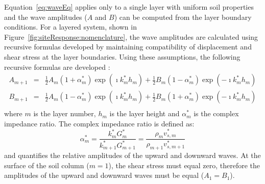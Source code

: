 \documentclass[12pt,oneside]{book}
\begin{document}
Equation~\ref{eq:waveEq} applies only to a single layer with uniform soil
properties and the wave amplitudes ($A$ and $B$) can be computed from the layer
boundary conditions.  For a layered system, shown in
Figure~\ref{fig:siteResponse:nomenclature}, the wave amplitudes are calculated
using recursive formulas developed by maintaining compatibility of displacement
and shear stress at the layer boundaries.  Using these assumptions, the
following recursive formulas are developed \citep{kramer:96}:
\begin{equation}
    \begin{array}{rcl}
        A_{m+1} & = & \frac{1}{2} A_m \left( 1 + \alpha_m^* \right) \exp\left(\imath k_m^* h_m \right) +
        \frac{1}{2} B_m \left( 1 - \alpha_m^* \right) \exp\left(-\imath k_m^* h_m \right)\\
        B_{m+1} & = & \frac{1}{2} A_m \left( 1 - \alpha_m^* \right) \exp\left(\imath k_m^* h_m\right) +
        \frac{1}{2} B_m \left( 1 + \alpha_m^* \right) \exp\left(-\imath k_m^* h_m \right)\\
    \end{array}
\end{equation}
where $m$ is the layer number, $h_m$ is the layer height and $\alpha_m^*$ is the
complex impedance ratio.  The complex impedance ratio is defined as:
\begin{equation}
    \alpha_m^* = \frac{k_m^* G_m^*}{k_{m+1}^* G_{m+1}^*} = \frac{\rho_m v_{s,m}^* }{\rho_{m+1}
    v_{s,m+1}^* } 
\end{equation}
and quantifies the relative amplitudes of the upward and downward waves.  At the
surface of the soil column ($m=1$), the shear stress must equal zero, therefore
the amplitudes of the upward and downward waves must be equal ($A_1=B_1$).  
\end{document}
